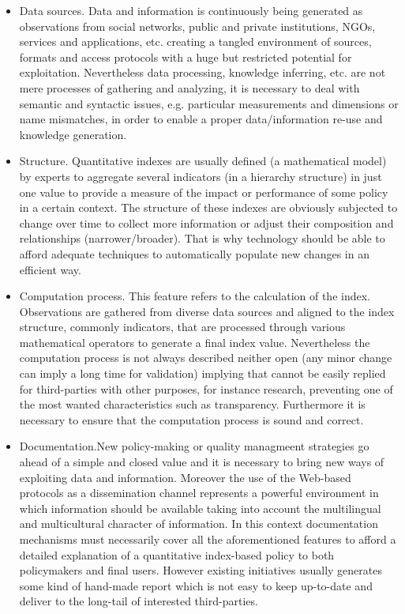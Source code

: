 \begin{itemize}
 \item Data sources. Data and information is continuously being generated as observations from social networks, public and private institutions, NGOs, services and applications, etc. 
 creating a tangled environment of sources, formats and access protocols with a huge but restricted potential for exploitation. Nevertheless data processing, knowledge inferring, etc. are not mere processes 
 of gathering and analyzing, it is necessary to deal with semantic and syntactic issues, e.g. particular measurements and dimensions or name mismatches, 
 in order to enable a proper data/information re-use and knowledge generation.
 
 \item Structure. Quantitative indexes are usually defined (a mathematical model) by experts to aggregate several indicators (in a hierarchy structure) in just one value to provide
 a measure of the impact or performance of some policy in a certain context. The structure of these indexes are obviously subjected to change over time 
 to collect more information or adjust their composition and relationships (narrower/broader). That is why technology should be able to afford 
 adequate techniques to automatically populate new changes in an efficient way.
 
  \item Computation process. This feature refers to the calculation of the index. Observations are gathered from diverse data sources and aligned 
  to the index structure, commonly indicators, that are processed through various mathematical operators to generate a final index value. 
  Nevertheless the computation process is not always described neither open (any minor change can imply a long time for validation) implying that 
  cannot be easily replied for third-parties with other purposes, for instance research, preventing one 
  of the most wanted characteristics such as transparency. Furthermore it is necessary to ensure that the computation process 
  is sound and correct.

  \item Documentation.New policy-making or quality managmeent strategies go ahead of a simple and closed value and it is necessary to bring 
  new ways of exploiting data and information. Moreover the use of the Web-based protocols as a dissemination channel represents a powerful environment in which 
  information should be available taking into account the multilingual and multicultural character of information. In this context documentation mechanisms 
  must necessarily cover all the aforementioned features to afford a detailed explanation of a quantitative index-based policy to both policymakers 
  and final users. However existing initiatives usually generates some kind of hand-made report which is not easy to keep up-to-date and deliver 
  to the long-tail of interested third-parties.
\end{itemize}

